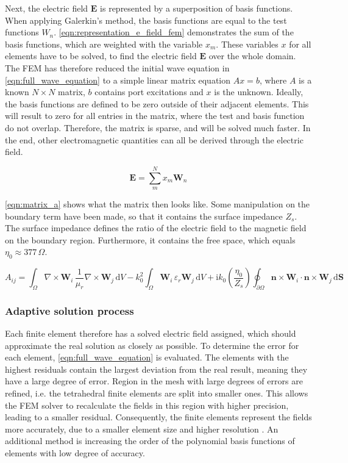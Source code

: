 Next, the electric field $\mathbf{E}$ is represented by a superposition of basis functions. When applying Galerkin's method, the basis functions are equal to the test functions $W_n$. \autoref{eqn:representation_e_field_fem} demonstrates the sum of the basis functions, which are weighted with the variable $x_m$. These variables $x$ for all elements have to be solved, to find the electric field $\mathbf{E}$ over the whole domain. The FEM has therefore reduced the initial wave equation in \autoref{eqn:full_wave_equation} to a simple linear matrix equation $Ax=b$, where $A$ is a known $N\times N$ matrix, $b$ contains port excitations and $x$ is the unknown. Ideally, the basis functions are defined to be zero outside of their adjacent elements. This will result to zero for all entries in the matrix, where the test and basis function do not overlap. Therefore, the matrix is sparse, and will be solved much faster. In the end, other electromagnetic quantities can all be derived through the electric field.

\begin{equation}
    \mathbf{E}=\sum^N_mx_m\mathbf{W}_n
    \label{eqn:representation_e_field_fem}
\end{equation}

\autoref{eqn:matrix_a} shows what the matrix then looks like. Some manipulation on the boundary term have been made, so that it contains the surface impedance $Z_s$. The surface impedance defines the ratio of the electric field to the magnetic field on the boundary region. Furthermore, it contains the free space, which equals $\eta_0 \approx 377\,\Omega$.

\begin{equation}
A_{ij} = \int_{\Omega} \nabla \times \mathbf{W}_i \, \frac{1}{\mu_r} \nabla \times \mathbf{W}_j \, \mathrm{d}V 
- k_0^2 \int_{\Omega} \mathbf{W}_i \, \varepsilon_r \mathbf{W}_j \, \mathrm{d}V 
+ \mathrm{i} k_0 \left(\frac{\eta_0}{Z_s}\right) \oint_{\partial\Omega} \mathbf{n} \times \mathbf{W}_i \cdot \mathbf{n} \times \mathbf{W}_j \, \mathrm{d}\mathbf{S}
\label{eqn:matrix_a}
\end{equation}

\subsubsection{Adaptive solution process}

Each finite element therefore has a solved electric field assigned, which should approximate the real solution as closely as possible. To determine the error for each element, \autoref{eqn:full_wave_equation} is evaluated. The elements with the highest residuals contain the largest deviation from the real result, meaning they have a large degree of error. Region in the mesh with large degrees of errors are refined, i.e. the tetrahedral finite elements are split into smaller ones. This allows the FEM solver to recalculate the fields in this region with higher precision, leading to a smaller residual. Consequently, the finite elements represent the fields more accurately, due to a smaller element size and higher resolution \cite{1063929}. An additional method is increasing the order of the polynomial basis functions of elements with low degree of accuracy.


